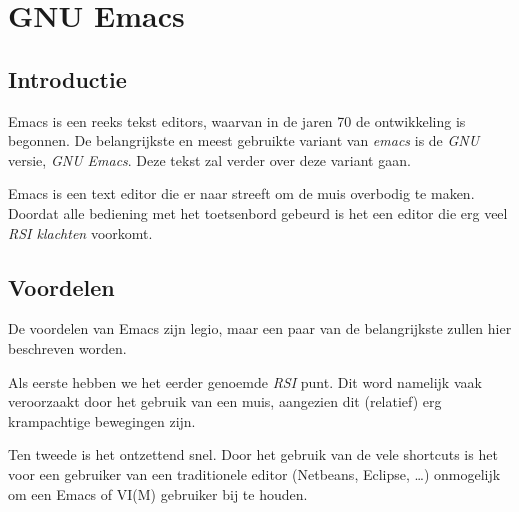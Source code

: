 %
%
%
%

\chapter{GNU Emacs}\label{app.emacs}
\section{Introductie}
Emacs\cite{bib.emacs.wiki}\cite{bib.emacs.gnu} is een reeks tekst editors, waarvan in de jaren 70 de ontwikkeling is begonnen. De belangrijkste en meest gebruikte variant van \emph{emacs} is de \emph{GNU} versie, \emph{GNU Emacs}. Deze tekst zal verder over deze variant gaan. 

Emacs is een text editor die er naar streeft om de muis overbodig te maken. Doordat alle bediening met het toetsenbord gebeurd is het een editor die erg veel \emph{RSI klachten} voorkomt. 

\section{Voordelen}
De voordelen van Emacs zijn legio, maar een paar van de belangrijkste zullen hier beschreven worden. 

Als eerste hebben we het eerder genoemde \emph{RSI} punt. Dit word namelijk vaak veroorzaakt door het gebruik van een muis, aangezien dit (relatief) erg krampachtige bewegingen zijn. 

Ten tweede is het ontzettend snel. Door het gebruik van de vele shortcuts is het voor een gebruiker van een traditionele editor (Netbeans, Eclipse, \ldots) onmogelijk om een Emacs of VI(M) gebruiker bij te houden. 

